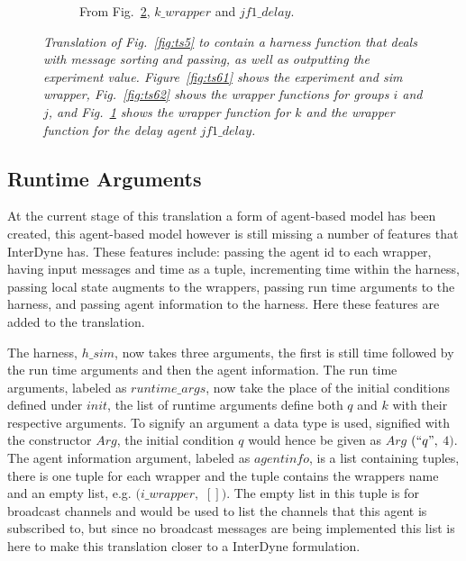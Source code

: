 \documentclass{article}
\begin{document}
\begin{figure}[H]\ContinuedFloat
	\centering
	\begin{subfigure}[b]{1\textwidth}
	
	\caption{From Fig.~\ref{fig:ts6}, $k\_wrapper$ and $jf1\_delay$.  }
        \label{fig:ts63}
	\end{subfigure}
	\caption{\it Translation of Fig.~\ref{fig:ts5} to contain a harness function that deals with message sorting and passing, as well as outputting the experiment value. Figure~\ref{fig:ts61} shows the experiment and sim wrapper, Fig.~\ref{fig:ts62} shows the wrapper functions for groups $i$ and $j$, and Fig.~\ref{fig:ts63} shows the wrapper function for $k$ and the wrapper function for the delay agent $jf1\_delay$.}
	\label{fig:ts6}
\end{figure} 





\subsection{Runtime Arguments}
At the current stage of this translation a form of agent-based model has been created, this agent-based model however is still missing a number of features that InterDyne has. These features include: passing the agent id to each wrapper, having input messages and time as a tuple, incrementing time within the harness, passing local state augments to the wrappers, passing run time arguments to the harness, and passing agent information to the harness. Here these features are added to the translation. 

The harness, $h\_sim$, now takes three arguments, the first is still time followed by the run time arguments and then the agent information. The run time arguments, labeled as $runtime\_args$, now take the place of the initial conditions defined under $init$, the list of runtime arguments define both $q$ and $k$ with their respective arguments. To signify an argument a data type is used, signified with the constructor $Arg$, the initial condition $q$ would hence be given as $Arg$ $(``q",$ $4)$. The agent information argument, labeled as $agentinfo$, is a list containing tuples, there is one tuple for each wrapper and the tuple contains the wrappers name and an empty list, e.g. $(i\_wrapper,$ $[])$. The empty list in this tuple is for broadcast channels and would be used to list the channels that this agent is subscribed to, but since no broadcast messages are being implemented this list is here to make this translation closer to a InterDyne formulation.
\end{document}

